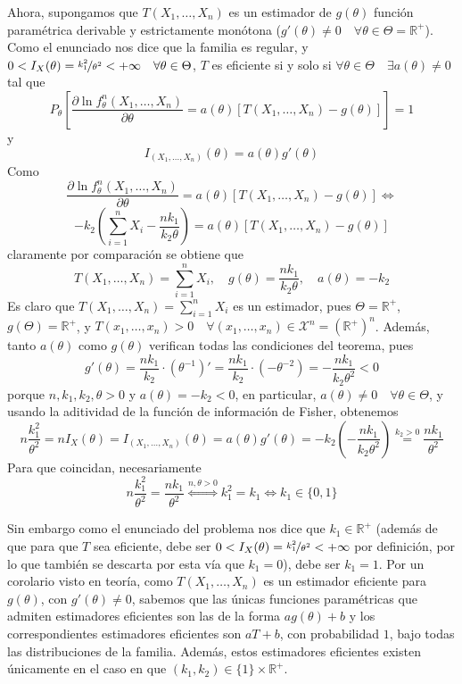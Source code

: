 \documentclass[12pt]{article}
\newcommand{\R}{\mathbb{R}}
\newcommand{\Rmas}{\R^{+}}
\newcommand{\X}{\mathcal{X}}
\begin{document}
\begin{ejercicio}[2 puntos]
\begin{enumerate}[label=\alph*)]
            Ahora, supongamos que $T(X_1, \ldots, X_n)$ es un estimador de $g(\theta)$ función paramétrica derivable y estrictamente monótona
            ($g'(\theta) \neq 0 \quad \forall \theta \in \Theta = \Rmas$). Como el enunciado nos dice que la familia es regular, y 
            $0 < I_X(\theta) = \nicefrac{k_1^2}{\theta^2} < +\infty \quad \forall \theta \in \Theta$, $T$ es eficiente si y solo si $\forall \theta \in \Theta
            \quad \exists a(\theta) \neq 0$ tal que 
            $$P_\theta \left[ \dfrac{\partial \ln f_\theta^n(X_1, \ldots, X_n)}{\partial \theta} = a(\theta)[T(X_1, \ldots, X_n) - g(\theta)]\right] = 1$$
            y
            $$I_{(X_1, \ldots, X_n)}(\theta) = a(\theta) g'(\theta)$$
            Como 
            $$\dfrac{\partial \ln f_\theta^n(X_1, \ldots, X_n)}{\partial \theta} = a(\theta)[T(X_1, \ldots, X_n) - g(\theta)] \iff$$
            $$- k_2 \left(\sum_{i=1}^{n} X_i - \dfrac{n k_1}{k_2\theta} \right) = a(\theta) [T(X_1, \ldots, X_n) - g(\theta)]$$
            claramente por comparación se obtiene que 
            $$T(X_1, \ldots, X_n) = \sum_{i=1}^{n} X_i, \quad g(\theta) = \dfrac{n k_1}{k_2\theta}, \quad a(\theta) = -k_2$$
            Es claro que $T(X_1, \ldots, X_n) = \sum_{i=1}^n X_i$ es un estimador, pues $\Theta = \Rmas$, $g(\Theta) = \Rmas$, y $T(x_1, \ldots, x_n) > 0 \quad \forall (x_1, \ldots, x_n) \in \X^n = (\Rmas)^n$. Además, tanto 
            $a(\theta)$ como $g(\theta)$ verifican todas las condiciones del teorema, pues $$g'(\theta) = \dfrac{n k_1}{k_2} \cdot (\theta^{-1})' = \dfrac{n k_1}{k_2} \cdot (- \theta^{-2}) = -\dfrac{nk_1}{k_2 \theta^2} < 0$$ porque $n, k_1, k_2, \theta > 0$
            y $a(\theta) = -k_2 < 0$, en particular, $a(\theta) \neq 0 \quad \forall \theta \in \Theta$, y usando la aditividad de la función de información de Fisher, obtenemos
            $$n \dfrac{k_1^2}{\theta^2} = n I_X(\theta) = I_{(X_1, \ldots, X_n)}(\theta) = a(\theta) g'(\theta) = -k_2 \left( - \dfrac{nk_1}{k_2 \theta^2} \right) \stackrel{k_2 > 0}{=} \dfrac{nk_1}{\theta^2}$$
            Para que coincidan, necesariamente $$n \dfrac{k_1^2}{\theta^2} = \dfrac{nk_1}{\theta^2} \stackrel{n, \theta > 0}{\iff} k_1^2 = k_1 \iff k_1 \in \{0,1\}$$

            Sin embargo como el enunciado del problema nos dice que $k_1 \in \Rmas$ (además de que para que $T$ sea eficiente, debe ser $0 < I_X(\theta) = \nicefrac{k_1^2}{\theta^2} < + \infty$ por definición, 
            por lo que también se descarta por esta vía que $k_1 = 0$), debe ser $k_1 = 1$. Por un corolario visto en teoría, como $T(X_1, \ldots, X_n)$ es un estimador eficiente para $g(\theta)$, con $g'(\theta) \neq 0$,
            sabemos que las únicas funciones paramétricas que admiten estimadores eficientes son las de la forma $a g(\theta) + b$ y los correspondientes
            estimadores eficientes son $aT + b$, con probabilidad $1$, bajo todas las distribuciones de la familia. Además, estos estimadores eficientes existen únicamente en el caso en que $(k_1, k_2) \in \{1\} \times \Rmas$.
        \end{enumerate}
    \end{ejercicio}
\end{document}
